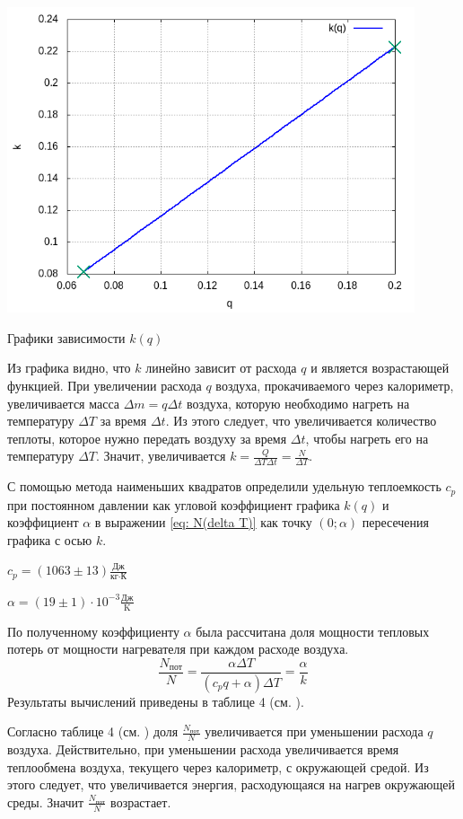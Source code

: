 \begin{center}
    \includegraphics[width=0.9\textwidth]{img/graph6 (1).png}
    
    Графики зависимости $k(q)$
\end{center}

Из графика видно, что $k$ линейно зависит от расхода $q$ и является возрастающей функцией. При увеличении расхода $q$ воздуха, прокачиваемого через калориметр, увеличивается масса $\Delta m = q\Delta t$ воздуха, которую необходимо нагреть на температуру $\Delta T$ за время $\Delta t$. Из этого следует, что увеличивается количество теплоты, которое нужно передать воздуху за время $\Delta t$, чтобы нагреть его на температуру $\Delta T$. Значит, увеличивается $k = \frac{Q}{\Delta T \Delta t} = \frac{N}{\Delta T}$.

С помощью метода наименьших квадратов определили удельную теплоемкость $c_p$ при постоянном давлении как угловой коэффициент графика $k(q)$ и коэффициент $\alpha$ в выражении \eqref{eq: N(delta T)} как точку $(0;\alpha)$ пересечения графика с осью $k$.
\begin{center}
    $c_p = (1063 \pm 13)\frac{\text{Дж}}{\text{кг} \cdot \text{К}}$

    $\alpha = (19 \pm 1)\cdot 10^{-3}\frac{\text{Дж}}{\text{K}}$
\end{center}

По полученному коэффициенту $\alpha$ была рассчитана доля мощности тепловых потерь от мощности нагревателя при каждом расходе воздуха.
\begin{equation}
    \frac{N_{\text{пот}}}{N} = \frac{\alpha\Delta T}{(c_p q + \alpha)\Delta T} = \frac{\alpha}{k}
\end{equation}
Результаты вычислений приведены в таблице 4 (см. ).


Согласно таблице 4 (см. ) доля $\frac{N_{\text{пот}}}{N}$ увеличивается при уменьшении расхода $q$ воздуха. Действительно, при уменьшении расхода увеличивается время теплообмена воздуха, текущего через калориметр, с окружающей средой. Из этого следует, что увеличивается энергия, расходующаяся на нагрев окружающей среды. Значит  $\frac{N_{\text{пот}}}{N}$ возрастает.